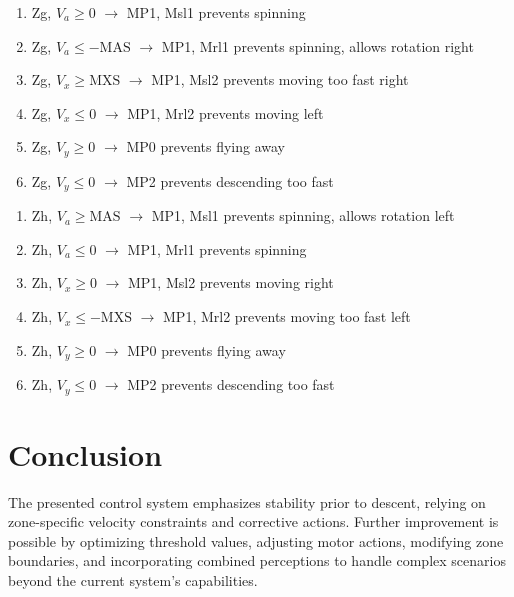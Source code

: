\documentclass{article}
\begin{document}
\begin{enumerate}
    \item Zg, $V_a \geq 0$ $\rightarrow$ MP1, Msl1 \hfill prevents spinning
    \item Zg, $V_a \leq -\text{MAS}$ $\rightarrow$ MP1, Mrl1 \hfill prevents spinning, allows rotation right
    \item Zg, $V_x \geq \text{MXS}$ $\rightarrow$ MP1, Msl2 \hfill prevents moving too fast right
    \item Zg, $V_x \leq 0$ $\rightarrow$ MP1, Mrl2 \hfill prevents moving left
    \item Zg, $V_y \geq 0$ $\rightarrow$ MP0 \hfill prevents flying away
    \item Zg, $V_y \leq 0$ $\rightarrow$ MP2 \hfill prevents descending too fast
    \end{enumerate}
    
\begin{enumerate}
    \item Zh, $V_a \geq \text{MAS}$ $\rightarrow$ MP1, Msl1 \hfill prevents spinning, allows rotation left
    \item Zh, $V_a \leq 0$ $\rightarrow$ MP1, Mrl1 \hfill prevents spinning
    \item Zh, $V_x \geq 0$ $\rightarrow$ MP1, Msl2 \hfill prevents moving right
    \item Zh, $V_x \leq -\text{MXS}$ $\rightarrow$ MP1, Mrl2 \hfill prevents moving too fast left
    \item Zh, $V_y \geq 0$ $\rightarrow$ MP0 \hfill prevents flying away
    \item Zh, $V_y \leq 0$ $\rightarrow$ MP2 \hfill prevents descending too fast
\end{enumerate}

\section{Conclusion}
The presented control system emphasizes stability prior to descent, relying on zone-specific velocity constraints and corrective actions. Further improvement is possible by optimizing threshold values, adjusting motor actions, modifying zone boundaries, and incorporating combined perceptions to handle complex scenarios beyond the current system's capabilities.
\end{document}
